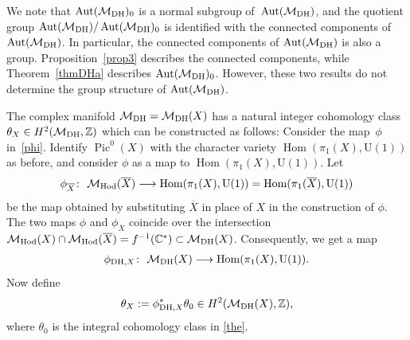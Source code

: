 \documentclass[pdftex]{sigma}
\numberwithin{equation}{section}
\begin{document}
\begin{Remark}\label{re-1} We note that $\operatorname{Aut}({\mathcal M}_{\rm DH})_0$ is a normal subgroup of~$\operatorname{Aut}({\mathcal M}_{\rm DH})$, and the quotient group $\operatorname{Aut}({\mathcal M}_{\rm DH})/\operatorname{Aut}({\mathcal M}_{\rm DH})_0$ is identif\/ied with the connected components of $\operatorname{Aut}({\mathcal M}_{\rm DH})$. In particular, the connected components of $\operatorname{Aut}({\mathcal M}_{\rm DH})$ is also a group. Proposition~\ref{prop3} describes the connected components, while Theorem~\ref{thmDHa} describes $\operatorname{Aut}({\mathcal M}_{\rm DH})_0$. However, these two results do not determine the group structure of $\operatorname{Aut}({\mathcal M}_{\rm DH})$.
\end{Remark}

The complex manifold ${\mathcal M}_{\rm DH} = {\mathcal M}_{\rm DH}(X)$ has a natural integer cohomology class $\theta_{X} \in H^2({\mathcal M}_{\rm DH}, {\mathbb Z})$ which can be constructed as follows: Consider the map~$\phi$ in~\eqref{phi}. Identify $\operatorname{Pic}^0(X)$ with the character variety $\operatorname{Hom}(\pi_1(X), \text{U}(1))$ as before, and consider $\phi$ as a map to $\operatorname{Hom}(\pi_1(X), \text{U}(1))$. Let
\begin{gather*}
\phi_{\overline X} \colon \ {\mathcal M}_{\rm Hod}({\overline X}) \longrightarrow \operatorname{Hom}(\pi_1(X), \text{U}(1)) = \operatorname{Hom}(\pi_1({\overline X}), \text{U}(1))
\end{gather*}
be the map obtained by substituting ${\overline X}$ in place of $X$ in the construction of $\phi$. The two maps $\phi$ and $\phi_{\overline X}$ coincide over the intersection ${\mathcal M}_{\rm Hod}(X)\cap \mathcal M_{\rm Hod}(\overline{X}) = f^{-1}({\mathbb C}^*) \subset {\mathcal M}_{\rm DH}(X)$. Consequently, we get a map
\begin{gather*}
\phi_{{\rm DH},X} \colon \  {\mathcal M}_{\rm DH}(X) \longrightarrow \operatorname{Hom}(\pi_1(X), \text{U}(1)) .
\end{gather*}
Now def\/ine
\begin{gather*}
\theta_{X} := \phi^*_{{\rm DH},X}\theta_0 \in H^2({\mathcal M}_{\rm DH}(X), {\mathbb Z}),
\end{gather*}
where $\theta_0$ is the integral cohomology class in \eqref{the}.
\end{document}
